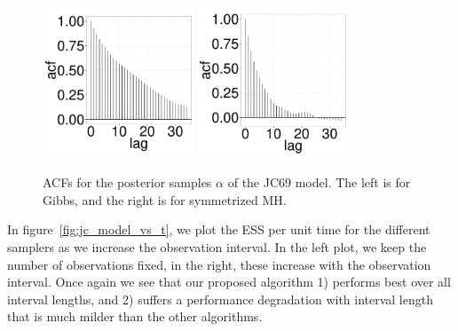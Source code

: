 {  \begin{figure}[H]
  \centering
  \begin{minipage}[!hp]{0.99\linewidth}
    \includegraphics [width=0.40\textwidth, angle=0]{figs/JC_ks/jc_gbsacf_44_05_3_.pdf}
	\hspace{.5in}
    \includegraphics [width=0.40\textwidth, angle=0]{figs/JC_ks/jc_mhacf_44_05_3_.pdf}
  \end{minipage}

    \caption{ACFs for the posterior samples $\alpha$ of the JC69 model. The left is for Gibbs, and the right is for symmetrized MH.}
     \label{fig:ACF_JC}
  \end{figure}

In figure~\ref{fig:jc_model_vs_t}, we plot the ESS per unit time for the
different samplers as we increase the observation interval. In the left plot,
we keep the number of observations fixed, in the right, these increase with
the observation interval. Once again we see that our proposed algorithm
1) performs best over all interval lengths, and 2) suffers a performance
degradation with interval length that is much milder than the other algorithms.

}
